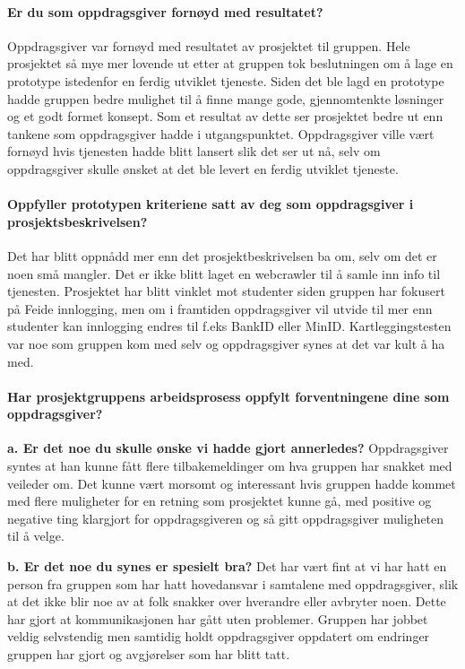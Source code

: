 \paragraph{Er du som oppdragsgiver fornøyd med resultatet?}
Oppdragsgiver var fornøyd med resultatet av prosjektet til gruppen. Hele prosjektet så mye mer lovende ut etter at gruppen tok beslutningen om å lage en prototype istedenfor en ferdig utviklet tjeneste. Siden det ble lagd en prototype hadde gruppen bedre mulighet til å finne mange gode, gjennomtenkte løsninger og et godt formet konsept. Som et resultat av dette ser prosjektet bedre ut enn tankene som oppdragsgiver hadde i utgangspunktet. Oppdragsgiver ville vært fornøyd hvis tjenesten hadde blitt lansert slik det ser ut nå, selv om oppdragsgiver skulle ønsket at det ble levert en ferdig utviklet tjeneste.

\paragraph{Oppfyller prototypen kriteriene satt av deg som oppdragsgiver i prosjektsbeskrivelsen?}
Det har blitt oppnådd mer enn det prosjektbeskrivelsen ba om, selv om det er noen små mangler. Det er ikke blitt laget en webcrawler til å samle inn info til tjenesten. Prosjektet har blitt vinklet mot studenter siden gruppen har fokusert på Feide innlogging, men om i framtiden oppdragsgiver vil utvide til mer enn studenter kan innlogging endres til f.eks BankID eller MinID. Kartleggingstesten var noe som gruppen kom med selv og oppdragsgiver synes at det var kult å ha med. 

\paragraph{Har prosjektgruppens arbeidsprosess oppfylt forventningene dine som oppdragsgiver?}

{\bf a. Er det noe du skulle ønske vi hadde gjort annerledes?}
Oppdragsgiver syntes at han kunne fått flere tilbakemeldinger om hva gruppen har snakket med veileder om. Det kunne vært morsomt og interessant hvis gruppen hadde kommet med flere muligheter for en retning som prosjektet kunne gå, med positive og negative ting klargjort for oppdragsgiveren og så gitt oppdragsgiver muligheten til å velge.

{\bf b. Er det noe du synes er spesielt bra?}
Det har vært fint at vi har hatt en person fra gruppen som har hatt hovedansvar i samtalene med oppdragsgiver, slik at det ikke blir noe av at folk snakker over hverandre eller avbryter noen. Dette har gjort at kommunikasjonen  har gått uten problemer. Gruppen har jobbet veldig selvstendig men samtidig holdt oppdragsgiver oppdatert om endringer gruppen har gjort og avgjørelser som har blitt tatt.


